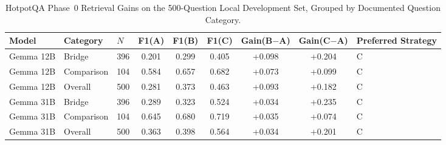 \begin{table}[H]
\centering
\caption{HotpotQA Phase~0 Retrieval Gains on the 500-Question Local Development Set, Grouped by Documented Question Category.}
\label{tab:retrieval-gain}
\small
\begin{adjustbox}{max width=\textwidth}
\begin{tabular}{@{}lllcccccl@{}}
\toprule
Model & Category & $N$ & F1(A) & F1(B) & F1(C) & Gain(B$-$A) & Gain(C$-$A) & Preferred Strategy \\
\midrule
Gemma 12B & Bridge & 396 & 0.201 & 0.299 & 0.405 & +0.098 & +0.204 & C \\
Gemma 12B & Comparison & 104 & 0.584 & 0.657 & 0.682 & +0.073 & +0.099 & C \\
Gemma 12B & Overall & 500 & 0.281 & 0.373 & 0.463 & +0.093 & +0.182 & C \\
Gemma 31B & Bridge & 396 & 0.289 & 0.323 & 0.524 & +0.034 & +0.235 & C \\
Gemma 31B & Comparison & 104 & 0.645 & 0.680 & 0.719 & +0.035 & +0.074 & C \\
Gemma 31B & Overall & 500 & 0.363 & 0.398 & 0.564 & +0.034 & +0.201 & C \\
\bottomrule
\end{tabular}
\end{adjustbox}
\end{table}
